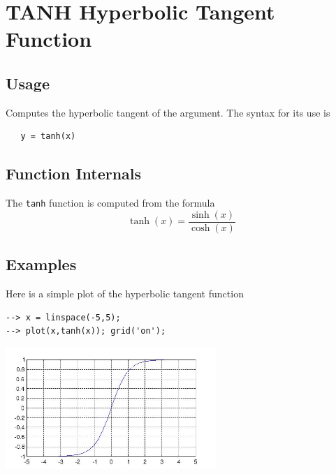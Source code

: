 \section{TANH Hyperbolic Tangent Function}

\subsection{Usage}

Computes the hyperbolic tangent of the argument.
The syntax for its use is
\begin{verbatim}
   y = tanh(x)
\end{verbatim}
\subsection{Function Internals}

The \verb|tanh| function is computed from the formula
\[
   \tanh(x) = \frac{\sinh(x)}{\cosh(x)}
\]
\subsection{Examples}

Here is a simple plot of the hyperbolic tangent function
\begin{verbatim}
--> x = linspace(-5,5);
--> plot(x,tanh(x)); grid('on');
\end{verbatim}


\centerline{\includegraphics[width=8cm]{tanhplot}}

